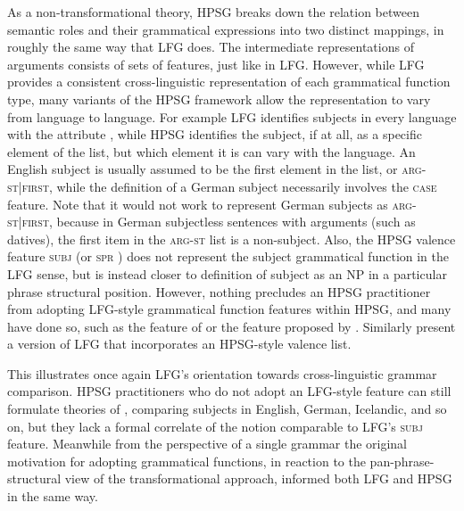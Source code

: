 As a non-transformational theory, HPSG breaks down the relation between semantic roles and their grammatical expressions into two distinct mappings, in roughly the same way that LFG does.  The intermediate representations of arguments consists of sets of features, just like in LFG.  However, while LFG provides a consistent cross-linguistic representation of each grammatical function type, many variants of the HPSG framework allow the representation to vary from language to language.  For example LFG identifies subjects in every language with the attribute , while HPSG identifies the subject, if at all, as a specific element of the  list, but which element it is can vary with the language.  An English subject is usually assumed to be the first element in the list, or \textsc{arg-st|first}, while the definition of a German subject necessarily involves the \textsc{case} feature.   Note that it would not work to represent German subjects as \textsc{arg-st|first}, because in German  subjectless sentences with arguments (such as datives),  the first item in the \textsc{arg-st} list is a non-subject.  Also, the HPSG valence feature \textsc{subj} (or \textsc{spr} ) 
does not represent the subject grammatical function in the LFG sense, but is instead closer to 
definition of subject as an NP in a particular phrase structural position.  However, nothing precludes an HPSG practitioner from adopting LFG-style grammatical function features within HPSG, and many have done so, such as the  feature of \citet{KDHB2007a} or the  feature proposed by \citet{Pollard94a}.  Similarly \citet{andrews1999complex} present a version of LFG that incorporates an HPSG-style valence list.  

This illustrates once again LFG's orientation towards cross-linguistic grammar comparison.  HPSG practitioners who do not adopt an LFG-style  feature can still formulate theories of , comparing subjects in English, German, Icelandic, and so on, but they lack a formal correlate of the notion  comparable to LFG's \textsc{subj} feature.  Meanwhile from the perspective of a single grammar the original motivation for adopting grammatical functions, in reaction to the pan-phrase-structural view of the transformational approach, informed both LFG and HPSG in the same way.  

